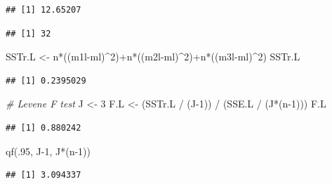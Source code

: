 \documentclass[
]{book}
\newenvironment{Shaded}{\begin{snugshade}}{\end{snugshade}}
\newcommand{\CommentTok}[1]{\textcolor[rgb]{0.56,0.35,0.01}{\textit{#1}}}
\newcommand{\DecValTok}[1]{\textcolor[rgb]{0.00,0.00,0.81}{#1}}
\newcommand{\FunctionTok}[1]{\textcolor[rgb]{0.00,0.00,0.00}{#1}}
\newcommand{\NormalTok}[1]{#1}
\newcommand{\OtherTok}[1]{\textcolor[rgb]{0.56,0.35,0.01}{#1}}
\newcommand{\SpecialCharTok}[1]{\textcolor[rgb]{0.00,0.00,0.00}{#1}}
\begin{document}
\begin{verbatim}
## [1] 12.65207
\end{verbatim}

\begin{Shaded}
\end{Shaded}

\begin{verbatim}
## [1] 32
\end{verbatim}

\begin{Shaded}
\begin{Highlighting}[]
\NormalTok{SSTr.L }\OtherTok{\textless{}{-}}\NormalTok{ n}\SpecialCharTok{*}\NormalTok{((m1l}\SpecialCharTok{{-}}\NormalTok{ml)}\SpecialCharTok{\^{}}\DecValTok{2}\NormalTok{)}\SpecialCharTok{+}\NormalTok{n}\SpecialCharTok{*}\NormalTok{((m2l}\SpecialCharTok{{-}}\NormalTok{ml)}\SpecialCharTok{\^{}}\DecValTok{2}\NormalTok{)}\SpecialCharTok{+}\NormalTok{n}\SpecialCharTok{*}\NormalTok{((m3l}\SpecialCharTok{{-}}\NormalTok{ml)}\SpecialCharTok{\^{}}\DecValTok{2}\NormalTok{)}
\NormalTok{SSTr.L}
\end{Highlighting}
\end{Shaded}

\begin{verbatim}
## [1] 0.2395029
\end{verbatim}

\begin{Shaded}
\begin{Highlighting}[]
\CommentTok{\# Levene F test}
\NormalTok{J }\OtherTok{\textless{}{-}} \DecValTok{3}
\NormalTok{F.L }\OtherTok{\textless{}{-}}\NormalTok{ (SSTr.L }\SpecialCharTok{/}\NormalTok{ (J}\DecValTok{{-}1}\NormalTok{)) }\SpecialCharTok{/}\NormalTok{ (SSE.L }\SpecialCharTok{/}\NormalTok{ (J}\SpecialCharTok{*}\NormalTok{(n}\DecValTok{{-}1}\NormalTok{)))}
\NormalTok{F.L}
\end{Highlighting}
\end{Shaded}

\begin{verbatim}
## [1] 0.880242
\end{verbatim}

\begin{Shaded}
\begin{Highlighting}[]
\FunctionTok{qf}\NormalTok{(.}\DecValTok{95}\NormalTok{, J}\DecValTok{{-}1}\NormalTok{, J}\SpecialCharTok{*}\NormalTok{(n}\DecValTok{{-}1}\NormalTok{))}
\end{Highlighting}
\end{Shaded}

\begin{verbatim}
## [1] 3.094337
\end{verbatim}

  
\end{document}
